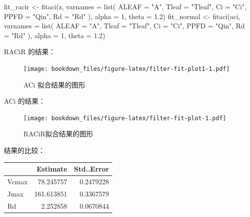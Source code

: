 \documentclass[
]{krantz}
\makeatletter
\newenvironment{Shaded}{\begin{snugshade}}{\end{snugshade}}
\newcommand{\AttributeTok}[1]{\textcolor[rgb]{0.77,0.63,0.00}{#1}}
\newcommand{\DecValTok}[1]{\textcolor[rgb]{0.00,0.00,0.81}{#1}}
\newcommand{\FloatTok}[1]{\textcolor[rgb]{0.00,0.00,0.81}{#1}}
\newcommand{\FunctionTok}[1]{\textcolor[rgb]{0.00,0.00,0.00}{#1}}
\newcommand{\NormalTok}[1]{#1}
\newcommand{\OtherTok}[1]{\textcolor[rgb]{0.56,0.35,0.01}{#1}}
\newcommand{\StringTok}[1]{\textcolor[rgb]{0.31,0.60,0.02}{#1}}
\newenvironment{kframe}{%
\medskip{}
\setlength{\fboxsep}{.8em}
 \def\at@end@of@kframe{}%
 \ifinner\ifhmode%
  \def\at@end@of@kframe{\end{minipage}}%
  \begin{minipage}{\columnwidth}%
 \fi\fi%
 \def\FrameCommand##1{\hskip\@totalleftmargin \hskip-\fboxsep
 \colorbox{shadecolor}{##1}\hskip-\fboxsep
     \hskip-\linewidth \hskip-\@totalleftmargin \hskip\columnwidth}%
 \MakeFramed {\advance\hsize-\width
   \@totalleftmargin\z@ \linewidth\hsize
   \@setminipage}}%
 {\par\unskip\endMakeFramed%
 \at@end@of@kframe}
\renewenvironment{Shaded}{\begin{kframe}}{\end{kframe}}
\makeatother
\begin{document}
\begin{Shaded}
\begin{Highlighting}[]
\NormalTok{fit\_racir }\OtherTok{\textless{}{-}} \FunctionTok{fitaci}\NormalTok{(z,}
               \AttributeTok{varnames =}
                 \FunctionTok{list}\NormalTok{(}
                   \AttributeTok{ALEAF =} \StringTok{"A"}\NormalTok{,}
                   \AttributeTok{Tleaf =} \StringTok{"Tleaf"}\NormalTok{,}
                   \AttributeTok{Ci =} \StringTok{"Ci"}\NormalTok{,}
                   \AttributeTok{PPFD  =} \StringTok{"Qin"}\NormalTok{,}
                   \AttributeTok{Rd =} \StringTok{"Rd"}
\NormalTok{                ), }\AttributeTok{alpha =} \DecValTok{1}\NormalTok{,}
               \AttributeTok{theta =} \FloatTok{1.2}\NormalTok{)}
\NormalTok{fit\_normal }\OtherTok{\textless{}{-}} \FunctionTok{fitaci}\NormalTok{(aci,}
               \AttributeTok{varnames =}
                 \FunctionTok{list}\NormalTok{(}
                   \AttributeTok{ALEAF =} \StringTok{"A"}\NormalTok{,}
                   \AttributeTok{Tleaf =} \StringTok{"Tleaf"}\NormalTok{,}
                   \AttributeTok{Ci =} \StringTok{"Ci"}\NormalTok{,}
                   \AttributeTok{PPFD  =} \StringTok{"Qin"}\NormalTok{,}
                   \AttributeTok{Rd =} \StringTok{"Rd"}
\NormalTok{                 ), }\AttributeTok{alpha =} \DecValTok{1}\NormalTok{,}
               \AttributeTok{theta =} \FloatTok{1.2}\NormalTok{)}
\end{Highlighting}
\end{Shaded}

RACiR 的结果：

\begin{figure}
\centering
\texttt{[image: bookdown\_files/figure-latex/filter-fit-plot1-1.pdf]}
\caption{\label{fig:filter-fit-plot1}ACi 拟合结果的图形}
\end{figure}

ACi 的结果：

\begin{figure}
\centering
\texttt{[image: bookdown\_files/figure-latex/filter-fit-plot-1.pdf]}
\caption{\label{fig:filter-fit-plot}RACiR拟合结果的图形}
\end{figure}

结果的比较：

\begin{tabular}{l|r|r}
\hline
  & Estimate & Std..Error\\
\hline
Vcmax & 78.245757 & 0.2479228\\
\hline
Jmax & 161.613851 & 0.3367579\\
\hline
Rd & 2.252858 & 0.0670844\\
\hline
\end{tabular}
\end{document}
